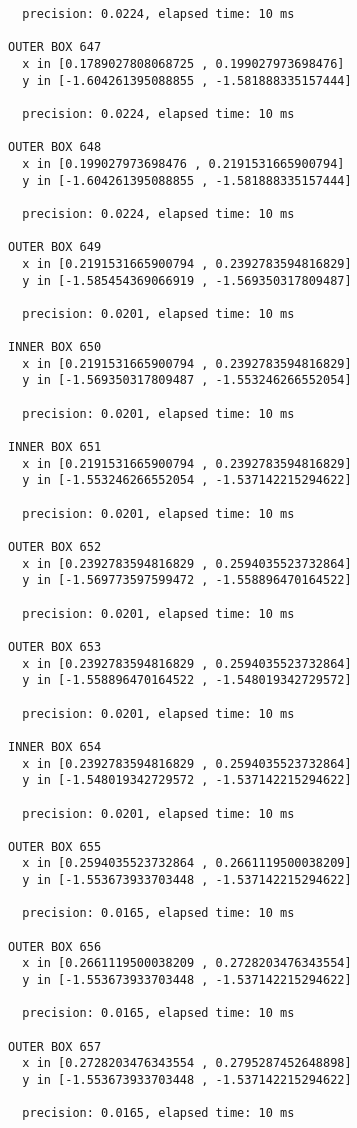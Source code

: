 \begin{verbatim}
  precision: 0.0224, elapsed time: 10 ms

OUTER BOX 647
  x in [0.1789027808068725 , 0.199027973698476]
  y in [-1.604261395088855 , -1.581888335157444]

  precision: 0.0224, elapsed time: 10 ms

OUTER BOX 648
  x in [0.199027973698476 , 0.2191531665900794]
  y in [-1.604261395088855 , -1.581888335157444]

  precision: 0.0224, elapsed time: 10 ms

OUTER BOX 649
  x in [0.2191531665900794 , 0.2392783594816829]
  y in [-1.585454369066919 , -1.569350317809487]

  precision: 0.0201, elapsed time: 10 ms

INNER BOX 650
  x in [0.2191531665900794 , 0.2392783594816829]
  y in [-1.569350317809487 , -1.553246266552054]

  precision: 0.0201, elapsed time: 10 ms

INNER BOX 651
  x in [0.2191531665900794 , 0.2392783594816829]
  y in [-1.553246266552054 , -1.537142215294622]

  precision: 0.0201, elapsed time: 10 ms

OUTER BOX 652
  x in [0.2392783594816829 , 0.2594035523732864]
  y in [-1.569773597599472 , -1.558896470164522]

  precision: 0.0201, elapsed time: 10 ms

OUTER BOX 653
  x in [0.2392783594816829 , 0.2594035523732864]
  y in [-1.558896470164522 , -1.548019342729572]

  precision: 0.0201, elapsed time: 10 ms

INNER BOX 654
  x in [0.2392783594816829 , 0.2594035523732864]
  y in [-1.548019342729572 , -1.537142215294622]

  precision: 0.0201, elapsed time: 10 ms

OUTER BOX 655
  x in [0.2594035523732864 , 0.2661119500038209]
  y in [-1.553673933703448 , -1.537142215294622]

  precision: 0.0165, elapsed time: 10 ms

OUTER BOX 656
  x in [0.2661119500038209 , 0.2728203476343554]
  y in [-1.553673933703448 , -1.537142215294622]

  precision: 0.0165, elapsed time: 10 ms

OUTER BOX 657
  x in [0.2728203476343554 , 0.2795287452648898]
  y in [-1.553673933703448 , -1.537142215294622]

  precision: 0.0165, elapsed time: 10 ms


\end{verbatim}
